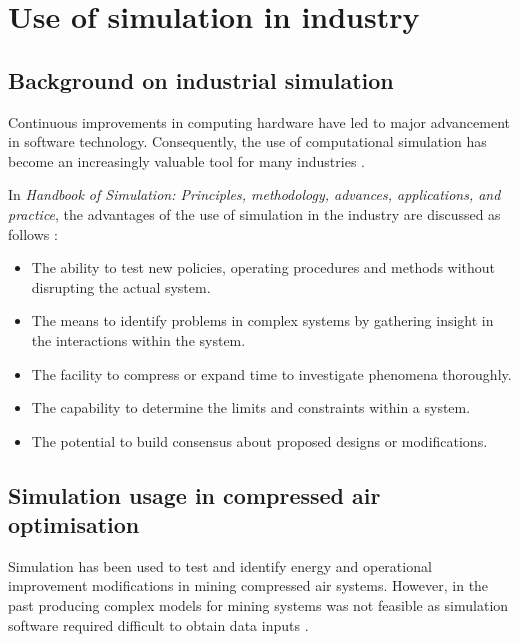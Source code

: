 \section{Use of simulation in industry }
	\subsection{Background on industrial simulation}
	
		Continuous improvements in computing hardware have led to major advancement in software technology. Consequently, the use of computational simulation has become an increasingly valuable tool for many industries \cite{kocsis2003integration}.
		\par 
		In \textit{ Handbook of Simulation: Principles, methodology, advances, applications, and practice}, the advantages of the use of simulation in the industry are discussed as follows \cite{banks1998handbook}: %
		\begin{itemize}
			\item The ability to test new policies, operating procedures and methods without disrupting the actual system.
			\item The means to identify problems in complex systems by gathering insight in the interactions within the system.
			\item The facility to compress or expand time to investigate phenomena thoroughly.
			\item The capability to determine the limits and constraints within a system.
			\item The potential to build consensus about proposed designs or modifications.
		\end{itemize}

	\subsection{Simulation usage in compressed air optimisation}
		Simulation has been used to test and identify energy and operational improvement modifications in mining compressed air systems. However, in the past producing complex models for mining systems was not feasible as simulation software required difficult to obtain data inputs \cite{marais2013simplification}. 
		\par 
